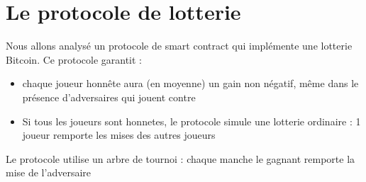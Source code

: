 \documentclass{article}
\begin{document}
\section{Le protocole de lotterie}
Nous allons analysé un protocole de smart contract qui implémente une lotterie Bitcoin. \cite{955}
Ce protocole garantit :
\begin{itemize}
\item chaque joueur honnête aura (en moyenne) un gain non négatif, même dans le
présence d'adversaires qui jouent contre 
\item Si tous les joueurs sont honnetes, le protocole simule une lotterie ordinaire : 1 joueur remporte les mises des autres joueurs 
\end{itemize}
Le protocole utilise un arbre de tournoi : chaque manche le gagnant remporte la mise de l'adversaire \\
\\ \\
\end{document}
